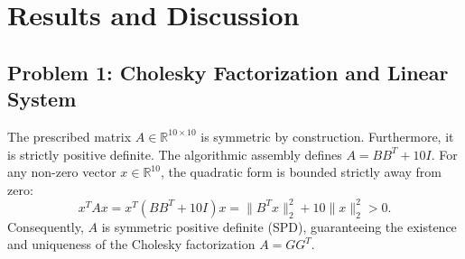 \section{Results and Discussion}

\subsection{Problem 1: Cholesky Factorization and Linear System}

The prescribed matrix $A \in \mathbb{R}^{10 \times 10}$ is symmetric by construction. Furthermore, it is strictly positive definite. The algorithmic assembly defines $A = B B^T + 10 I$. For any non-zero vector $x \in \mathbb{R}^{10}$, the quadratic form is bounded strictly away from zero:
\begin{equation}
    x^T A x = x^T (B B^T + 10 I) x = \|B^T x\|_2^2 + 10 \|x\|_2^2 > 0.
\end{equation}
Consequently, $A$ is symmetric positive definite (SPD), guaranteeing the existence and uniqueness of the Cholesky factorization $A = G G^T$.


